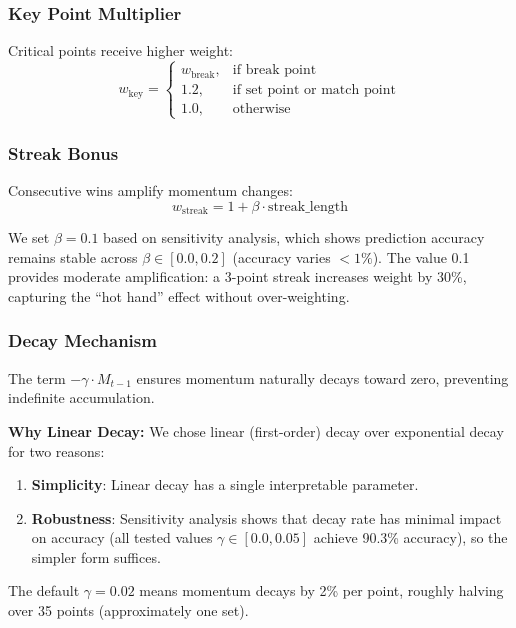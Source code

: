 \documentclass{mcmthesis}
\begin{document}
\subsubsection{Key Point Multiplier}

Critical points receive higher weight:
\begin{equation}
w_{\text{key}} = \begin{cases}
w_{\text{break}}, & \text{if break point} \\
1.2, & \text{if set point or match point} \\
1.0, & \text{otherwise}
\end{cases}
\end{equation}

\subsubsection{Streak Bonus}

Consecutive wins amplify momentum changes:
\begin{equation}
w_{\text{streak}} = 1 + \beta \cdot \text{streak\_length}
\end{equation}

We set $\beta = 0.1$ based on sensitivity analysis, which shows prediction accuracy remains stable across $\beta \in [0.0, 0.2]$ (accuracy varies $<1\%$). The value 0.1 provides moderate amplification: a 3-point streak increases weight by 30\%, capturing the ``hot hand'' effect without over-weighting.

\subsubsection{Decay Mechanism}

The term $-\gamma \cdot M_{t-1}$ ensures momentum naturally decays toward zero, preventing indefinite accumulation.

\textbf{Why Linear Decay:} We chose linear (first-order) decay over exponential decay for two reasons:
\begin{enumerate}
    \item \textbf{Simplicity}: Linear decay has a single interpretable parameter.
    \item \textbf{Robustness}: Sensitivity analysis shows that decay rate has minimal impact on accuracy (all tested values $\gamma \in [0.0, 0.05]$ achieve 90.3\% accuracy), so the simpler form suffices.
\end{enumerate}

The default $\gamma = 0.02$ means momentum decays by 2\% per point, roughly halving over 35 points (approximately one set).
\end{document}
